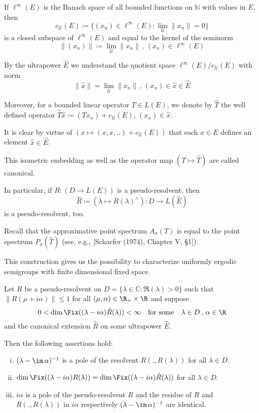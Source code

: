If $\ell^{\infty}(E)$ is the Banach space of all bounded functions on $\mathbb{N}$ with values in $E$, then
\[
c_{\mathcal{U}}(E) \coloneqq \{(x_{n}) \in \ell^{\infty}(E) \colon \lim_{\mathcal{U}}\|x_{n}\| = 0\}
\]
is a closed subspace of $\ell^{\infty}(E)$ and equal to the kernel of the seminorm
\[
\|(x_{n})\| \coloneqq \lim_{\mathcal{U}}\|x_{n}\| \, , \, (x_{n}) \in \ell^{\infty}(E)
\]

By the ultrapower $\hat{E}$ we understand the quotient space $\ell^{\infty}(E)/c_{\mathcal{U}}(E)$ with norm
\[
\|\hat{x}\| = \lim_{\mathcal{U}}\|x_{n}\| \, , \, (x_{n}) \in \hat{x} \in \hat{E}
\]

Moreover, for a bounded linear operator $T \in L(E)$, we denote by $\hat{T}$ the well defined operator $\hat{T}\hat{x} \coloneqq (Tx_{n}) + c_{\mathcal{U}}(E)$, $(x_{n}) \in \hat{x}$.

It is clear by virtue of $(x \mapsto (x, x, ..) + c_{\mathcal{U}}(E))$ that each $x \in E$ defines an element $\hat{x} \in \hat{E}$.

This isometric embedding as well as the operator map $(T \mapsto \hat{T})$ are called canonical.

In particular, if $R: (D \to L(E))$ is a pseudo-resolvent, then
\[
\hat{R} \coloneqq (\lambda \mapsto R(\lambda)^{\wedge}): D \to L(\hat{E})
\]
is a pseudo-resolvent, too.

Recall that the approximative point spectrum $A_{\sigma}(T)$ is equal to the point spectrum $P_{\sigma}(\hat{T})$ (see, e.g., [Schaefer (1974), Chapter V, §1]).

This construction gives us the possibility to characterize uniformly ergodic semigroups with finite dimensional fixed space.

\begin{lemma}\label{lem:d3-2.2}
Let $R$ be a pseudo-resolvent on $D = \{\lambda \in \mathbb{C}: \Re(\lambda) > 0\}$ such that $\|R(\mu+i\alpha)\| \leq 1$ for all $(\mu,\alpha) \in \R_{+} \times \R$ and suppose
\[
0 < \dim \Fix((\lambda-i\alpha)\hat{R}(\lambda)) < \infty \quad \text{for some} \quad \lambda \in D \, , \, \alpha \in \R
\]
and the canonical extension $\hat{R}$ on some ultrapower $\hat{E}$.





Then the following assertions hold:

\begin{enumerate}[(i)]
\item $(\lambda - \im\,\alpha)^{-1}$ is a pole of the resolvent $R(.,R(\lambda))$ for all $\lambda \in D$.

\item $\dim \Fix((\lambda-i\alpha)R(\lambda)) = \dim \Fix((\lambda-i\alpha)\hat{R}(\lambda))$ for all $\lambda \in D$.

\item $i\alpha$ is a pole of the pseudo-resolvent $R$ and the residue of $R$ and $R(.,R(\lambda))$ in $i\alpha$ respectively $(\lambda - \im\,\alpha)^{-1}$ are identical.
\end{enumerate}
\end{lemma}

